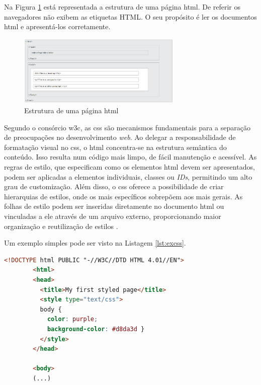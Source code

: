 Na Figura \ref{fig:estruturahtml} está representada a estrutura de uma página \acrshort{html}. De referir os navegadores não exibem as etiquetas HTML. O seu propósito é ler os documentos \acrshort{html} e apresentá-los corretamente.

\begin{figure}[hbtp]
    \centering
    \includegraphics[width=0.7\textwidth]{figures/html_page_structure.png}
    \caption{Estrutura de uma página \acrshort{html} \cite{HTMLbasics}}
    \label{fig:estruturahtml}
\end{figure}

Segundo o consórcio \gls{w3c}, as \acrshort{css} são mecanismos fundamentais para a separação de preocupações no desenvolvimento \textit{web}. Ao delegar a responsabilidade de formatação visual no \acrshort{css}, o \acrshort{html} concentra-se na estrutura semântica do conteúdo. Isso resulta num código mais limpo, de fácil manutenção e acessível. As regras de estilo, que especificam como os elementos \acrshort{html} devem ser apresentados, podem ser aplicadas a elementos individuais, classes ou \textit{IDs}, permitindo um alto grau de customização. Além disso, o \acrshort{css} oferece a possibilidade de criar hierarquias de estilos, onde os mais específicos sobrepõem aos mais gerais. As folhas de estilo podem ser inseridas diretamente no documento \acrshort{html} ou vinculadas a ele através de um arquivo externo, proporcionando maior organização e reutilização de estilos \cite{w3ccss}.

Um exemplo simples pode ser visto na Listagem \ref{lst:excss}.

\begin{minipage}{0.9\linewidth}
    \begin{lstlisting}[language=HTML, caption=Exemplo \acrshort{css} incluído na página \acrshort{html} \cite{Startingcss}, label=lst:excss]
		<!DOCTYPE html PUBLIC "-//W3C//DTD HTML 4.01//EN">
		<html>
		<head>
		  <title>My first styled page</title>
		  <style type="text/css">
		  body {
			color: purple;
			background-color: #d8da3d }
		  </style>
		</head>
		
		<body>
		(...)
	\end{lstlisting}
\end{minipage}

